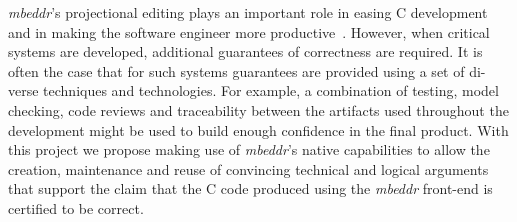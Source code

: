 \emph{mbeddr}’s projectional editing plays an important role in easing C
development and in making the software engineer more
productive~\cite{VoelterRKS13}.
 However, when critical systems are developed,
additional guarantees of correctness are required. It is often the case that for
such systems guarantees are provided using a set of di- verse techniques and
technologies.
For example, a combination of testing, model checking, code reviews and
traceability between the artifacts used throughout the development might be used
to build enough confidence in the final product.
With this project we propose making use of \emph{mbeddr}’s native capabilities
to allow the creation, maintenance and reuse of convincing technical and logical
arguments that support the claim that the C code produced using the
\emph{mbeddr} front-end is certified to be correct.